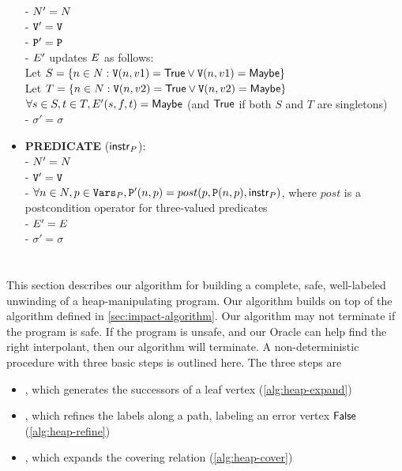 \begin{itemize}
    - $N' = N$ \\
    - $\mathtt{V}' = \mathtt{V}$ \\
    - $\mathtt{P}' = \mathtt{P}$ \\
    - $E'$ updates $E$ as follows: \\
      \hspace*{1em} Let $S = \{n \in N : \mathtt{V}(n, v1) = \mathsf{True} \vee \mathtt{V}(n, v1) = \mathsf{Maybe}\}$ \\
      \hspace*{1em} Let $T = \{n \in N : \mathtt{V}(n, v2) = \mathsf{True} \vee \mathtt{V}(n, v2) = \mathsf{Maybe}\}$ \\
      \hspace*{1em} $\forall s \in S, t \in T, E'(s,f,t) = \mathsf{Maybe}$ (and $\mathsf{True}$ if both $S$ and $T$ are singletons) \\
    - $\sigma' = \sigma$
  \item \textbf{PREDICATE} ($\mathsf{instr}_P$): \\
    - $N' = N$ \\
    - $\mathtt{V}' = \mathtt{V}$ \\
    - $\forall n \in N, p \in \mathtt{Vars}_P, \mathtt{P}'(n,p) = post(p, \mathtt{P}(n,p), \mathsf{instr}_P)$, where $post$ is a postcondition operator for three-valued predicates \\
    - $E' = E$ \\
    - $\sigma' = \sigma$
\end{itemize}

\section{\verifier}
This section describes our algorithm for building a complete, safe, well-labeled unwinding of a heap-manipulating program. Our algorithm builds on top of the \impact algorithm defined in \autoref{sec:impact-algorithm}. Our algorithm may not terminate if the program is safe. If the program is unsafe, and our Oracle can help find the right interpolant, then our algorithm will terminate. A non-deterministic procedure with three basic steps is outlined here. The three steps are

\begin{itemize}
  \item \expandp, which generates the successors of a leaf vertex (\autoref{alg:heap-expand})
  \item {}, which refines the labels along a path, labeling an error vertex $\mathsf{False}$ (\autoref{alg:heap-refine})
  \item \coverp, which expands the covering relation (\autoref{alg:heap-cover})
\end{itemize}

